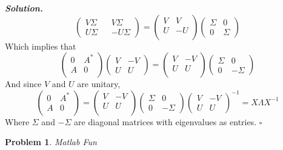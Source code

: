 \documentclass[12pt]{report}
\newtheorem{problem}{Problem}
\newenvironment{solution}[1][\it{Solution}]{\textbf{#1. } }{$\square$}
\begin{document}
\begin{solution}
$$\begin{pmatrix}
        V\Sigma&&V\Sigma\\U\Sigma&&-U\Sigma
    \end{pmatrix}=\begin{pmatrix}
        V&V\\U&-U\\
    \end{pmatrix}\begin{pmatrix}
        \Sigma&0\\0&\Sigma
    \end{pmatrix}$$
    Which implies that
    $$\begin{pmatrix}
        0&A^*\\A&0\\
    \end{pmatrix}\begin{pmatrix}
        V&-V\\U&U
    \end{pmatrix} = \begin{pmatrix}
        V&-V\\U&U\\
    \end{pmatrix}\begin{pmatrix}
        \Sigma&0\\0&-\Sigma
    \end{pmatrix}$$
    And since $V$ and $U$ are unitary,
    $$\begin{pmatrix}
        0&A^*\\A&0\\
    \end{pmatrix} = \begin{pmatrix}
        V&-V\\U&U\\
    \end{pmatrix}\begin{pmatrix}
        \Sigma&0\\0&-\Sigma
    \end{pmatrix}
    \begin{pmatrix}
        V&-V\\U&U
    \end{pmatrix}^{-1} = X \Lambda X^{-1}$$
    Where $\Sigma$ and $-\Sigma$ are diagonal matrices with eigenvalues as entries. 
\end{solution}

\newpage

\begin{problem}
    Matlab Fun
\end{problem}
\end{document}
